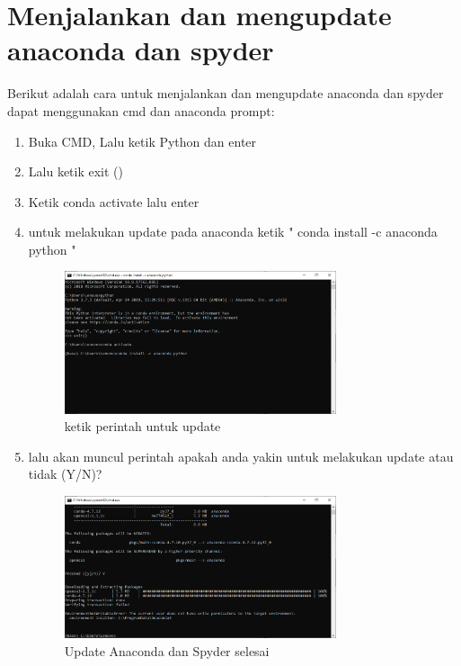     \section{Menjalankan dan mengupdate anaconda dan spyder}
    Berikut adalah cara untuk menjalankan dan mengupdate anaconda dan spyder dapat menggunakan cmd dan anaconda prompt:
    \begin{enumerate}
        \item Buka CMD, Lalu ketik Python dan enter
        \item Lalu ketik exit ()
        \item Ketik conda activate lalu enter
        \item untuk melakukan update pada anaconda ketik " conda install -c anaconda python "
        \begin{figure}[!htpb]
			\includegraphics[width=8cm]{figures/up.PNG}
			\centering
			\caption{ketik perintah untuk update}
		\end{figure}
        \item lalu akan muncul perintah apakah anda yakin untuk melakukan update atau tidak (Y/N)?
        \begin{figure}[!htpb]
			\includegraphics[width=8cm]{figures/upfinish.PNG}
			\centering
			\caption{Update Anaconda dan Spyder selesai}
		\end{figure}
        
    \end{enumerate}

